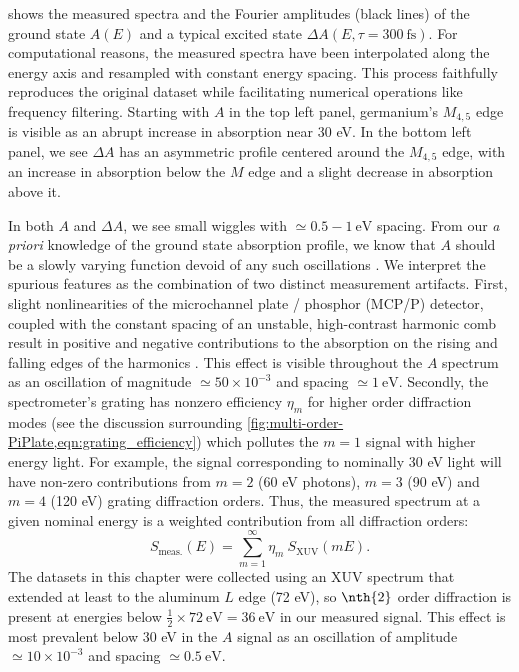  shows the measured spectra and the Fourier amplitudes (black lines) of the ground state $A(E)$ and a typical excited state $\Delta A(E, \tau=300 \ \textrm{fs})$. For computational reasons, the measured spectra have been interpolated along the energy axis and resampled with constant energy spacing. This process faithfully reproduces the original dataset while facilitating numerical operations like frequency filtering. Starting with $A$ in the top left panel, germanium's $M_{4,5}$ edge is visible as an abrupt increase in absorption near 30 eV. In the bottom left panel, we see $\Delta A$ has an asymmetric profile centered around the $M_{4,5}$ edge, with an increase in absorption below the $M$ edge and a slight decrease in absorption above it.

In both $A$ and $\Delta A$, we see small wiggles with $\simeq 0.5 - 1 \ \textrm{eV}$ spacing. From our \textit{a priori} knowledge of the ground state absorption profile, we know that $A$ should be a slowly varying function devoid of any such oscillations \cite{zurchDirectSimultaneousObservation2017}. We interpret the spurious features as the combination of two distinct measurement artifacts. First, slight nonlinearities of the microchannel plate / phosphor (MCP/P) detector, coupled with the constant spacing of an unstable, high-contrast harmonic comb result in positive and negative contributions to the absorption on the rising and falling edges of the harmonics \cite{linImpactSpatialChirp2016,cirriAchievingSurfaceSensitivity2017}. This effect is visible throughout the $A$ spectrum as an oscillation of magnitude $\simeq 50 \times 10^{-3}$ and spacing $\simeq 1 \ \textrm{eV}$. Secondly, the spectrometer's grating has nonzero efficiency $\eta_m$ for higher order diffraction modes (see the discussion surrounding \cref{fig:multi-order-PiPlate,eqn:grating_efficiency}) which pollutes the $m=1$ signal with higher energy light. For example, the signal corresponding to nominally {30 eV} light will have non-zero contributions from $m=2$ ({60 eV} photons), $m=3$ ({90 eV}) and $m=4$ ({120 eV}) grating diffraction orders. Thus, the measured spectrum at a given nominal energy is a weighted contribution from all diffraction orders:
\begin{equation}
S_{\textrm{meas.}}(E) = \sum_{m=1}^{\infty} \eta_m \ S_{\textrm{XUV}}(mE).
\end{equation}
The datasets in this chapter were collected using an XUV spectrum that extended at least to the aluminum $L$ edge (72 eV), so $\nth{2}$ order diffraction is present at energies below ${\frac{1}{2} \times 72 \ \textrm{eV} = 36 \ \textrm{eV}}$ in our measured signal. This effect is most prevalent below 30 eV in the $A$ signal as an oscillation of amplitude $\simeq 10 \times 10^{-3}$ and spacing $\simeq 0.5 \ \textrm{eV}$.

